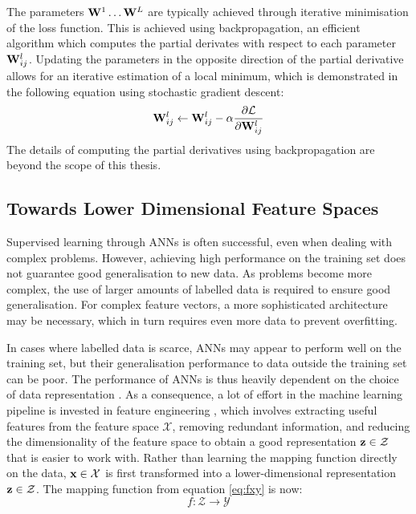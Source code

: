 		The parameters $\mathbf{W}^1 \dots \mathbf{W}^L$ are typically achieved through iterative minimisation of the loss function. This is achieved using backpropagation, an efficient algorithm which computes the partial derivates with respect to each parameter $\mathbf{W}^l_{ij}$. Updating the parameters in the opposite direction of the partial derivative allows for an iterative estimation of a local minimum, which is demonstrated in the following equation using stochastic gradient descent:
		$$
			\mathbf{W}^l_{ij} \leftarrow \mathbf{W}^l_{ij} - \alpha \frac{\partial \mathcal{L}}{\partial \mathbf{W}^l_{ij}}
		$$
		The details of computing the partial derivatives using backpropagation are beyond the scope of this thesis.

	
	\subsection{Towards Lower Dimensional Feature Spaces}
	
	Supervised learning through ANNs is often successful, even when dealing with complex problems. However, achieving high performance on the training set does not guarantee good generalisation to new data. As problems become more complex, the use of larger amounts of labelled data is required to ensure good generalisation. For complex feature vectors, a more sophisticated architecture may be necessary, which in turn requires even more data to prevent overfitting. %
	
	In cases where labelled data is scarce, ANNs may appear to perform well on the training set, but their generalisation performance to data outside the training set can be poor. The performance of ANNs is thus heavily dependent on the choice of data representation \citep{bengioRepresentationLearningReview2013a}. As a consequence, a lot of effort in the machine learning pipeline is invested in feature engineering \citep{zhengFeatureEngineeringMachine2018}, which involves extracting useful features from the feature space $\mathcal{X}$, removing redundant information, and reducing the dimensionality of the feature space \citep{valiDeepLearningLand2020} to obtain a good representation $\mathbf{z} \in \mathcal{Z}$ that is easier to work with. Rather than learning the mapping function directly on the data, $\mathbf{x} \in \mathcal{X}$ is first transformed into a lower-dimensional representation $\mathbf{z} \in \mathcal{Z}$. The mapping function from equation \ref{eq:fxy} is now:
	$$f: \mathcal{Z} \rightarrow \mathcal{Y} \label{eq:fxz} $$
	
